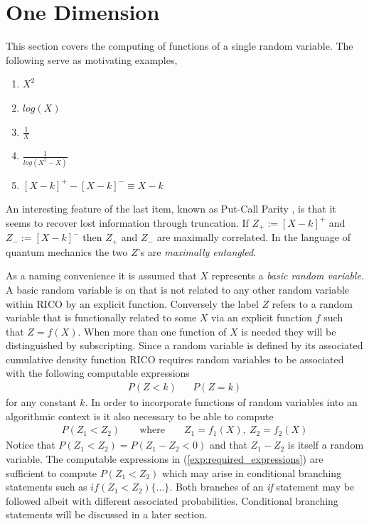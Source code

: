 \section{One Dimension}

This section covers the computing of functions of a single random variable. The following serve as motivating examples,
\begin{enumerate}
\item $X^2$
\item $log(X)$
\item $\frac{1}{X}$
\item $\frac{1}{log(X^2-X)}$
\item $[X-k]^+ - [X-k]^- \equiv X - k$
\label{example:motivating_examples}
\end{enumerate}

An interesting feature of the last item, known as Put-Call Parity \cite{dineen00}, is that it seems to recover lost information through truncation. If $Z_+ := [X-k]^+$ and $Z_- := [X-k]^-$ then $Z_+$ and $Z_-$ are maximally correlated. In the language of quantum mechanics the two $Z$'s are \emph{maximally entangled}. 

As a naming convenience it is assumed that $X$ represents a \emph{basic random variable}. A basic random variable is on that is not related to any other random variable within RICO by an explicit function. Conversely the label $Z$ refers to a random variable that is functionally related to some $X$ via an explicit function $f$ such that $Z = f(X)$. When more than one function of $X$ is needed they will be distinguished by subscripting. Since a random variable is defined by its associated cumulative density function RICO requires random variables to be associated with the following computable expressions
\begin{align}
P(Z < k) && P(Z = k)
\label{exp:required_expressions}
\end{align}
for any constant $k$. In order to incorporate functions of random variables into an algorithmic context is it also necessary to be able to compute
\begin{align*}
P(Z_1 < Z_2) && \text{ where } && Z_1 = f_1(X),\: Z_2 = f_2(X)
\end{align*}
Notice that $P(Z_1 < Z_2) = P(Z_1 - Z_2 < 0)$ and that $Z_1 - Z_2$ is itself a random variable. The computable expressions in (\ref{exp:required_expressions}) are sufficient to compute $P(Z_1 < Z_2)$ which may arise in conditional branching statements such as $if(Z_1 < Z_2) \{...\}$. Both branches of an \emph{if} statement may be followed albeit with different associated probabilities. Conditional branching statements will be discussed in a later section.

